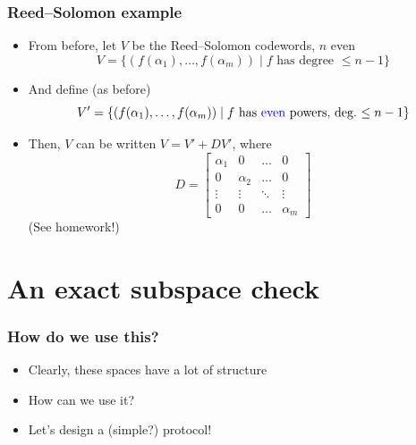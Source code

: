 \documentclass{beamer}
\newcommand{\blue}[1]{{\color{blue}#1}}
\begin{document}
    \begin{frame}
        \frametitle{Reed--Solomon example}
        \begin{itemize}\itemsep=12pt
            \item From before, let $V$ be the Reed--Solomon codewords, $n$ even
            \[
                V = \{(f(\alpha_1), \dots, f(\alpha_m)) \mid \text{$f$ has degree $\le n-1$}\}
            \]

            \item And define (as before)
            \[
                V' = \{(f(\alpha_1), \dots, f(\alpha_m)) \mid \text{$f$ has \blue{even} powers, deg.\ $\le n-1$}\}
            \]

            \pause

            \item Then, $V$ can be written $V = V' + DV'$, where
            \[
                D = \begin{bmatrix}
                        \alpha_1 & 0 & \dots & 0\\
                        0 & \alpha_2 & \dots & 0\\
                        \vdots & \vdots & \ddots & \vdots\\
                        0 & 0 & \dots & \alpha_m
                    \end{bmatrix}
            \]
            (See homework!)
        \end{itemize}
	\end{frame}

    \section{An exact subspace check}
    \begin{frame}
        \frametitle{How do we use this?}
        \begin{itemize}\itemsep=12pt
            \item Clearly, these spaces have a lot of structure
            \item How can we use it?
            \pause
            \item Let's design a (simple?) protocol!
        \end{itemize}
	\end{frame}
\end{document}
